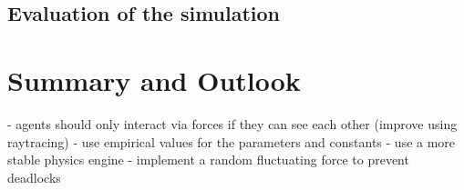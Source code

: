 \documentclass[11pt]{article}
\begin{document}
\subsection{Evaluation of the simulation}

\section{Summary and Outlook}
- agents should only interact via forces if they can see each other (improve using raytracing)
- use empirical values for the parameters and constants
- use a more stable physics engine
- implement a random fluctuating force to prevent deadlocks





\end{document}

